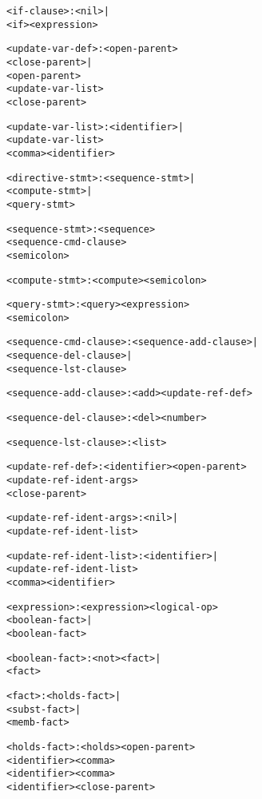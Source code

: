 \documentclass[11pt]{report}
\newenvironment{vverbatim}
{
  \begin{alltt}
}
{
    \vspace{-\baselineskip}
  \end{alltt}
}
\begin{document}
\begin{vverbatim}
<if-clause>              : <nil> |
                           <if> <expression>

<update-var-def>         : <open-parent>
                           <close-parent> |
                           <open-parent>
                           <update-var-list>
                           <close-parent>

<update-var-list>        : <identifier> |
                           <update-var-list>
                           <comma> <identifier>

<directive-stmt>         : <sequence-stmt> |
                           <compute-stmt> |
                           <query-stmt>

<sequence-stmt>          : <sequence>
                           <sequence-cmd-clause>
                           <semicolon>

<compute-stmt>           : <compute> <semicolon>

<query-stmt>             : <query> <expression>
                           <semicolon>

<sequence-cmd-clause>    : <sequence-add-clause> |
                           <sequence-del-clause> |
                           <sequence-lst-clause>

<sequence-add-clause>    : <add> <update-ref-def>

<sequence-del-clause>    : <del> <number>

<sequence-lst-clause>    : <list>

<update-ref-def>         : <identifier> <open-parent>
                           <update-ref-ident-args>
                           <close-parent>

<update-ref-ident-args>  : <nil> |
                           <update-ref-ident-list>

<update-ref-ident-list>  : <identifier> |
                           <update-ref-ident-list>
                           <comma> <identifier>

<expression>             : <expression> <logical-op>
                           <boolean-fact> |
                           <boolean-fact>

<boolean-fact>           : <not> <fact> |
                           <fact>

<fact>                   : <holds-fact> |
                           <subst-fact> |
                           <memb-fact>

<holds-fact>             : <holds> <open-parent>
                           <identifier> <comma>
                           <identifier> <comma>
                           <identifier> <close-parent>


\end{vverbatim}
\end{document}
